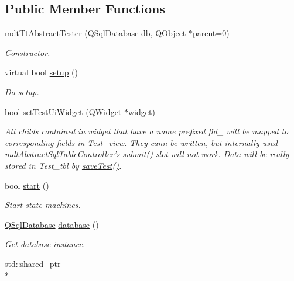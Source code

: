 \subsection*{Public Member Functions}
\begin{DoxyCompactItemize}
\item 
\hyperlink{classmdt_tt_abstract_tester_a8585d02e83ba1512b59d5e3984540b0a}{mdt\-Tt\-Abstract\-Tester} (\hyperlink{class_q_sql_database}{Q\-Sql\-Database} db, Q\-Object $\ast$parent=0)
\begin{DoxyCompactList}\small\item\em Constructor. \end{DoxyCompactList}\item 
virtual bool \hyperlink{classmdt_tt_abstract_tester_a08e423ef173c8f925b351110637c8050}{setup} ()
\begin{DoxyCompactList}\small\item\em Do setup. \end{DoxyCompactList}\item 
bool \hyperlink{classmdt_tt_abstract_tester_a9cc3f5bfe9e27ac0ae376ea1c82e8585}{set\-Test\-Ui\-Widget} (\hyperlink{class_q_widget}{Q\-Widget} $\ast$widget)
\begin{DoxyCompactList}\small\item\em All childs contained in widget that have a name prefixed fld\-\_\- will be mapped to corresponding fields in Test\-\_\-view. They cann be written, but internally used \hyperlink{classmdt_abstract_sql_table_controller}{mdt\-Abstract\-Sql\-Table\-Controller}'s submit() slot will not work. Data will be really stored in Test\-\_\-tbl by \hyperlink{classmdt_tt_abstract_tester_a36fe4f0ba9940455a975538f89660327}{save\-Test()}. \end{DoxyCompactList}\item 
bool \hyperlink{classmdt_tt_abstract_tester_ab1095b5fc987c9d52de66b6c02ec7785}{start} ()
\begin{DoxyCompactList}\small\item\em Start state machines. \end{DoxyCompactList}\item 
\hyperlink{class_q_sql_database}{Q\-Sql\-Database} \hyperlink{classmdt_tt_abstract_tester_a43687d08109c032bc83ed287e8fdecc4}{database} ()
\begin{DoxyCompactList}\small\item\em Get database instance. \end{DoxyCompactList}\item 
std\-::shared\-\_\-ptr\\*

\end{DoxyCompactItemize}

